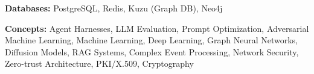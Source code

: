 \documentclass[11pt,a4paper]{article}
\begin{document}
\vspace{4pt}

\noindent\textbf{Databases:} PostgreSQL, Redis, Kuzu (Graph DB), Neo4j

\vspace{4pt}

\noindent\textbf{Concepts:} Agent Harnesses, LLM Evaluation, Prompt Optimization, Adversarial Machine Learning, Machine Learning, Deep Learning, Graph Neural Networks, Diffusion Models, RAG Systems, Complex Event Processing, Network Security, Zero-trust Architecture, PKI/X.509, Cryptography

% 
\end{document}
